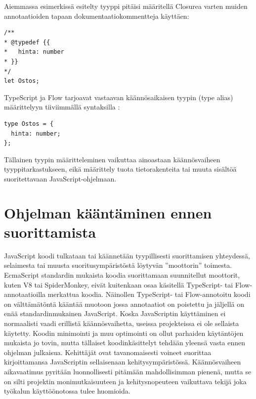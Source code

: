 \begin{minipage}{\linewidth}
Aiemmassa esimerkissä esitelty tyyppi  pitäisi
määritellä Closurea varten muiden annotaatioiden tapaan dokumentaatiokommentteja käyttäen:
\begin{lstlisting}[label={lst:closure_typedef}]
/**
* @typedef {{
*   hinta: number
* }}
*/
let Ostos;
\end{lstlisting}
\end{minipage}

TypeScript ja Flow tarjoavat vastaavan käännösaikaisen tyypin (type alias)
määrittelyyn tiiviimmällä syntaksilla \cite{TypeScriptSpec}:

\begin{minipage}{\linewidth}
\begin{lstlisting}[label={lst:ts_flow_type_alias}]
type Ostos = {
  hinta: number;
};
\end{lstlisting}
\end{minipage}
Tällainen tyypin määritteleminen vaikuttaa ainoastaan käännösvaiheen
tyyppitarkastukseen, eikä määrittely tuota tietorakenteita tai muuta
sisältöä suoritettavaan JavaScript-ohjelmaan.

\section{Ohjelman kääntäminen ennen suorittamista}

JavaScript koodi tulkataan tai käännetään tyypillisesti suorittamisen
yhteydessä, selaimesta tai muusta suoritusympäristöstä löytyvän ”moottorin”
toimesta. EcmaScript standardin mukaista koodia suorittamaan suunnitellut
moottorit, kuten V8 tai SpiderMonkey, eivät kuitenkaan osaa käsitellä
TypeScript- tai Flow-annotaatioilla merkattua koodia. Näinollen TypeScript-
tai Flow-annotoitu koodi on välttämätöntä kääntää muotoon jossa
annotaatiot on poistettu ja jäljellä on enää standardinmukainen JavaScript.
Koska JavaScriptin käyttäminen ei normaalisti vaadi erillistä
käännösvaihetta, useissa projekteissa ei ole sellaista käytetty. Koodin
minimointi ja muu optimointi on ollut parhaiden käytäntöjen mukaista jo
tovin, mutta tällaiset koodinkäsittelyt tehdään yleensä vasta ennen ohjelman
julkaisua. Kehittäjät ovat tavanomaisesti voineet suorittaa kirjoittamansa
JavaScriptin sellaisenaan kehitysympäristössä. Käännösvaiheen aikavaatimus
pyritään luonnollisesti pitämään mahdollisimman pienenä, mutta se on silti
projektin monimutkaisuuteen ja kehitysnopeuteen vaikuttava tekijä joka
työkalun käyttöönotossa tulee huomioida.


